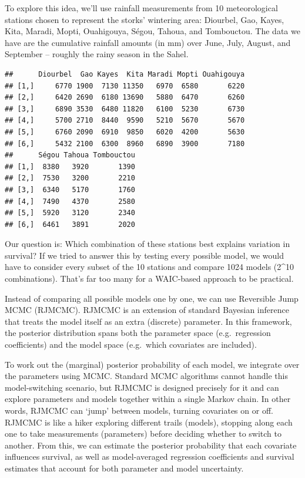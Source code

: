 \documentclass[
  12pt,
]{krantz}
\begin{document}
To explore this idea, we'll use rainfall measurements from 10 meteorological stations chosen to represent the storks' wintering area: Diourbel, Gao, Kayes, Kita, Maradi, Mopti, Ouahigouya, Ségou, Tahoua, and Tombouctou. The data we have are the cumulative rainfall amounts (in mm) over June, July, August, and September -- roughly the rainy season in the Sahel.

\begin{verbatim}
##      Diourbel  Gao Kayes  Kita Maradi Mopti Ouahigouya
## [1,]     6770 1900  7130 11350   6970  6580       6220
## [2,]     6420 2690  6180 13690   5880  6470       6260
## [3,]     6890 3530  6480 11820   6100  5230       6730
## [4,]     5700 2710  8440  9590   5210  5670       5670
## [5,]     6760 2090  6910  9850   6020  4200       5630
## [6,]     5432 2100  6300  8960   6890  3900       7180
##      Ségou Tahoua Tombouctou
## [1,]  8380   3920       1390
## [2,]  7530   3200       2210
## [3,]  6340   5170       1760
## [4,]  7490   4370       2580
## [5,]  5920   3120       2340
## [6,]  6461   3891       2020
\end{verbatim}

Our question is: Which combination of these stations best explains variation in survival? If we tried to answer this by testing every possible model, we would have to consider every subset of the 10 stations and compare 1024 models (2\^{}10 combinations). That's far too many for a WAIC-based approach to be practical.

Instead of comparing all possible models one by one, we can use Reversible Jump MCMC (RJMCMC). RJMCMC is an extension of standard Bayesian inference that treats the model itself as an extra (discrete) parameter. In this framework, the posterior distribution spans both the parameter space (e.g.~regression coefficients) and the model space (e.g.~which covariates are included).

To work out the (marginal) posterior probability of each model, we integrate over the parameters using MCMC. Standard MCMC algorithms cannot handle this model-switching scenario, but RJMCMC is designed precisely for it and can explore parameters and models together within a single Markov chain. In other words, RJMCMC can `jump' between models, turning covariates on or off. RJMCMC is like a hiker exploring different trails (models), stopping along each one to take measurements (parameters) before deciding whether to switch to another. From this, we can estimate the posterior probability that each covariate influences survival, as well as model-averaged regression coefficients and survival estimates that account for both parameter and model uncertainty.
\end{document}
